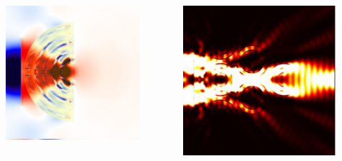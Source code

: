 \documentclass{beamer}
\begin{document}
\begin{frame}
	\begin{columns}
		\begin{column}{0.5\textwidth}
			\begin{figure}
				\includegraphics[width=\textwidth]{../images/multilayer/konc_polk_poynt.png}\\
			\end{figure}
		\end{column}
		\begin{column}{0.5\textwidth}
				\includegraphics[width=\textwidth]{../images/multilayer/konc_coreshell_energy.png}\\
		\end{column}
	\end{columns}
		
\end{frame}
\end{document}

